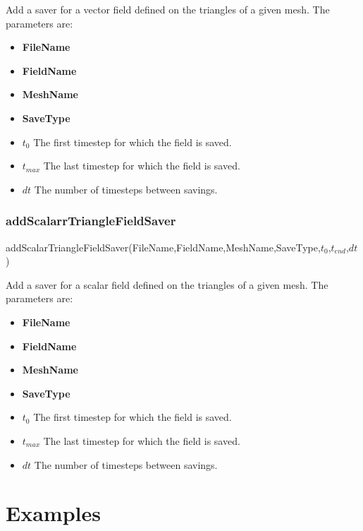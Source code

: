 \documentclass{report}
\begin{document}
Add a saver for a vector field defined on the triangles of a given mesh. The parameters are:
\begin{itemize}
\item \textbf{FileName}
\item \textbf{FieldName}
\item \textbf{MeshName}
\item \textbf{SaveType}
\item \textbf{$t_0$} The first timestep for which the field is saved.
\item \textbf{$t_{max}$} The last timestep for which the field is saved.
\item \textbf{$dt$} The number of timesteps between savings. 

\end{itemize}

\subsection{addScalarrTriangleFieldSaver}
\textsf{addScalarTriangleFieldSaver(FileName,FieldName,MeshName,SaveType,$t_0$,$t_{end}$,$dt$)}
\par \medskip

Add a saver for a scalar field defined on the triangles of a given mesh. The parameters are:
\begin{itemize}
\item \textbf{FileName}
\item \textbf{FieldName}
\item \textbf{MeshName}
\item \textbf{SaveType}
\item \textbf{$t_0$} The first timestep for which the field is saved.
\item \textbf{$t_{max}$} The last timestep for which the field is saved.
\item \textbf{$dt$} The number of timesteps between savings. 

\end{itemize}

\chapter{Examples}
\end{document}
